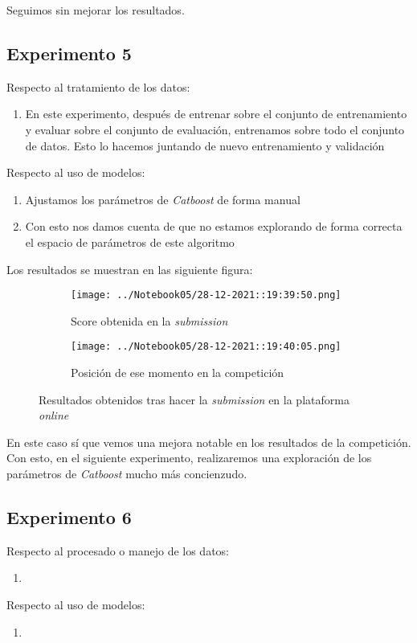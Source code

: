 \documentclass[11pt]{article}
\begin{document}
Seguimos sin mejorar los resultados.

\pagebreak

\subsection{Experimento 5}

Respecto al tratamiento de los datos:

\begin{enumerate}
    \item En este experimento, después de entrenar sobre el conjunto de entrenamiento y evaluar sobre el conjunto de evaluación, entrenamos sobre todo el conjunto de datos. Esto lo hacemos juntando de nuevo entrenamiento y validación
\end{enumerate}

Respecto al uso de modelos:

\begin{enumerate}
    \item Ajustamos los parámetros de \emph{Catboost} de forma manual
    \item Con esto nos damos cuenta de que no estamos explorando de forma correcta el espacio de parámetros de este algoritmo
\end{enumerate}

Los resultados se muestran en las siguiente figura:

\begin{figure}[H]
    \centering

    \begin{subfigure}[b]{0.45 \textwidth}
        \texttt{[image: ../Notebook05/28-12-2021::19:39:50.png]}
        \caption{Score obtenida en la \emph{submission}}
    \end{subfigure}
    \begin{subfigure}[b]{0.45 \textwidth}
        \texttt{[image: ../Notebook05/28-12-2021::19:40:05.png]}
        \caption{Posición de ese momento en la competición}
    \end{subfigure}

    \caption{Resultados obtenidos tras hacer la \emph{submission} en la plataforma \emph{online}}
\end{figure}

En este caso sí que vemos una mejora notable en los resultados de la competición. Con esto, en el siguiente experimento, realizaremos una exploración de los parámetros de \emph{Catboost} mucho más concienzudo.

\pagebreak

\subsection{Experimento 6}

Respecto al procesado o manejo de los datos:

\begin{enumerate}
    \item
\end{enumerate}

Respecto al uso de modelos:

\begin{enumerate}
    \item
\end{enumerate}




\end{document}
